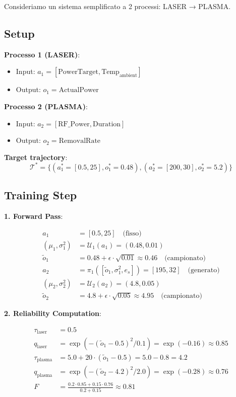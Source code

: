 \documentclass[11pt,a4paper]{article}
\begin{document}
Consideriamo un sistema semplificato a 2 processi: LASER → PLASMA.

\subsection{Setup}

\textbf{Processo 1 (LASER)}:
\begin{itemize}
    \item Input: $a_1 = [\text{PowerTarget}, \text{Temp}_{\text{ambient}}]$
    \item Output: $o_1 = \text{ActualPower}$
\end{itemize}

\textbf{Processo 2 (PLASMA)}:
\begin{itemize}
    \item Input: $a_2 = [\text{RF\_Power}, \text{Duration}]$
    \item Output: $o_2 = \text{RemovalRate}$
\end{itemize}

\textbf{Target trajectory}:
\begin{equation}
\mathcal{T}^* = \{(a_1^* = [0.5, 25], o_1^* = 0.48), (a_2^* = [200, 30], o_2^* = 5.2)\}
\end{equation}

\subsection{Training Step}

\textbf{1. Forward Pass}:

\begin{align}
a_1 &= [0.5, 25] \quad \text{(fisso)} \\
(\mu_1, \sigma_1^2) &= \mathcal{U}_1(a_1) = (0.48, 0.01) \\
\tilde{o}_1 &= 0.48 + \epsilon \cdot \sqrt{0.01} \approx 0.46 \quad \text{(campionato)} \\
a_2 &= \pi_1([\tilde{o}_1, \sigma_1^2, e_s]) = [195, 32] \quad \text{(generato)} \\
(\mu_2, \sigma_2^2) &= \mathcal{U}_2(a_2) = (4.8, 0.05) \\
\tilde{o}_2 &= 4.8 + \epsilon \cdot \sqrt{0.05} \approx 4.95 \quad \text{(campionato)}
\end{align}

\textbf{2. Reliability Computation}:

\begin{align}
\tau_{\text{laser}} &= 0.5 \\
q_{\text{laser}} &= \exp(-(\tilde{o}_1 - 0.5)^2 / 0.1) = \exp(-0.16) \approx 0.85 \\
\tau_{\text{plasma}} &= 5.0 + 20 \cdot (\tilde{o}_1 - 0.5) = 5.0 - 0.8 = 4.2 \\
q_{\text{plasma}} &= \exp(-(\tilde{o}_2 - 4.2)^2 / 2.0) = \exp(-0.28) \approx 0.76 \\
F &= \frac{0.2 \cdot 0.85 + 0.15 \cdot 0.76}{0.2 + 0.15} \approx 0.81
\end{align}
\end{document}
